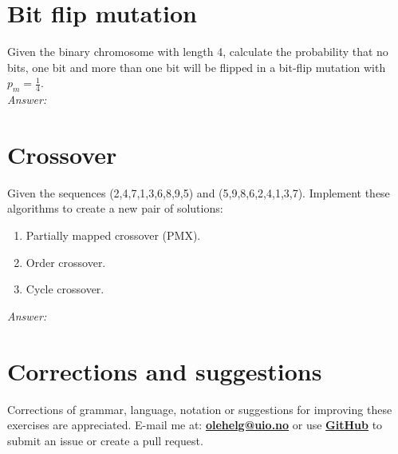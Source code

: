 \documentclass{article}           %
\newcommand\marginsymbol[1][0pt]{%
  \tabto*{0cm}\makebox[\dimexpr-1cm-#1\relax][r]{$\mathbb{P}$}\tabto*{\TabPrevPos}}
\begin{document}
\section{Bit flip mutation}
Given the binary chromosome with length 4, calculate the probability that no
bits, one bit and more than one bit will be flipped in a bit-flip mutation with
\(p_m = \frac{1}{4}\).\\

\emph{Answer:}


\section{Crossover \marginsymbol}
Given the sequences (2,4,7,1,3,6,8,9,5) and (5,9,8,6,2,4,1,3,7). Implement
these algorithms to create a new pair of solutions:
\renewcommand{\theenumi}{\alph{enumi}}
\begin{enumerate}
  \item Partially mapped crossover (PMX).
  \item Order crossover.
  \item Cycle crossover.
\end{enumerate}

\emph{Answer:}


\section*{Corrections and suggestions}
Corrections of grammar, language, notation or suggestions for improving these exercises are appreciated.
E-mail me at: \href{mailto:olehelg@uio.no}{\textbf{olehelg@uio.no}} or use
\href{https://github.com/olehermanse/INF3490-AI_Machine_Learning}{\textbf{GitHub}}
to submit an issue or create a pull request.
\end{document}
